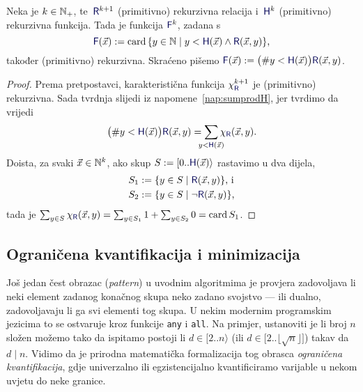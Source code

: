 \begin{lema}[{name=[ograničeno brojenje čuva (primitivnu) rekurzivnost]}]\label{lm:brojrek}
Neka je $k\in{\mathbb N}_+$, te\, $\f R^{k+1}$ (primitivno) rekurzivna relacija i\, $\f H^k$ (primitivno) rekurzivna funkcija. Tada je funkcija $\f F^k$, zadana s
\begin{equation}
    \f F(\vec x):=\card\,\{y\in\N\mid y<\f H(\vec x)\land\f R(\vec x,y)\}\text,
\end{equation}
također (primitivno) rekurzivna. Skraćeno pišemo $\f F(\vec x):=\bigl(\#y<\f H(\vec x)\bigr)\f R(\vec x,y)$.
\end{lema}
\begin{proof}
    Prema pretpostavci, karakteristična funkcija $\chi_{\f R}^{k+1}$ je (primitivno) rekurzivna. Sada tvrdnja slijedi iz napomene~\ref{nap:sumprodH}, jer tvrdimo da vrijedi
    \begin{equation}
        \bigl(\#y<\f H(\vec x)\bigr)\f R(\vec x,y)=\sum_{\mathclap{y<\f H(\vec x)}}\chi_{\f R}(\vec x,y)\text.
    \end{equation}
    Doista, za svaki $\vec x\in{\mathbb N}^k$, ako skup $S:=[0..\f H(\vec x)\rangle$ rastavimo u dva dijela,
    \begin{align}
        S_1&:=\{y\in S\mid\f R(\vec x,y)\}\text{, i}\\
        S_2&:=\{y\in S\mid\lnot\f R(\vec x,y)\}\text,
    \end{align}
    tada je
        $\sum_{y\in S}\chi_{\f R}(\vec x,y)=\sum_{y\in S_1}1+\sum_{y\in S_2}0=\card S_1$.
\end{proof}

\subsection{Ograničena kvantifikacija i minimizacija}

Još jedan čest obrazac (\emph{pattern}) u uvodnim algoritmima je provjera zadovoljava li neki element zadanog konačnog skupa neko zadano svojstvo --- ili dualno, zadovoljavaju li ga svi elementi tog skupa. U nekim modernim programskim jezicima to se ostvaruje kroz funkcije \texttt{any} i \texttt{all}. Na primjer, ustanoviti je li broj $n$ složen možemo tako da ispitamo postoji li $d\in[2..n\rangle$ (ili $d\in\bigl[2..\lfloor\!\sqrt{n}\rfloor\bigr]$) takav da $d\mathrel|n$. Vidimo da je prirodna matematička formalizacija tog obrasca \emph{ograničena kvantifikacija}, gdje univerzalno ili egzistencijalno kvantificiramo varijable u nekom uvjetu do neke granice.

